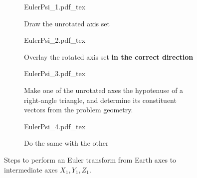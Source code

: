 \documentclass{report}
\begin{document}
        \def\svgwidth{1\textwidth}
\begin{figure}
	\begin{subfigure}{.5\textwidth} %
		\def\svgwidth{1\textwidth}\centering
		{EulerPsi_1.pdf_tex}
		\caption{Draw the unrotated axis set}\label{fig:euler1} %
	\end{subfigure}
	\begin{subfigure}{0.5\textwidth} %
	    \def\svgwidth{1\textwidth}\centering
		{EulerPsi_2.pdf_tex}
		\caption{Overlay the rotated axis set \textbf{in the correct direction}}\label{fig:euler2} %
	\end{subfigure}
	\quad
	\begin{subfigure}{0.5\textwidth} %
	    \def\svgwidth{1\textwidth}\centering
		{EulerPsi_3.pdf_tex}
		\caption{Make one of the unrotated axes the hypotenuse of a right-angle triangle, and determine its constituent vectors from the problem geometry.}\label{fig:euler3}
	\end{subfigure}
	\begin{subfigure}{0.5\textwidth} %
	    \def\svgwidth{1\textwidth}\centering
		{EulerPsi_4.pdf_tex}
		\caption{Do the same with the other\vspace{1cm}}\label{fig:euler4}
	\end{subfigure}
	\caption{Steps to perform an Euler transform from Earth axes to intermediate axes $X_1, Y_1, Z_1$.}\label{fig:transform1} %
\end{figure}
\end{document}
